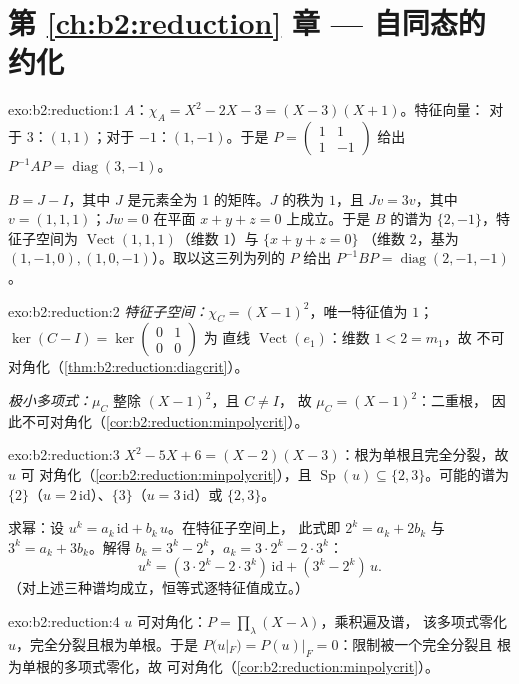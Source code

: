 \section*{第 \ref{ch:b2:reduction} 章 --- 自同态的约化}

\begin{solution}{exo:b2:reduction:1}
$A$：$\chi_A = X^2 - 2X - 3 = (X - 3)(X + 1)$。特征向量：
对于 $3$：$(1,1)$；对于 $-1$：$(1,-1)$。于是 $P = \begin{pmatrix} 1 & 1\\ 1
& -1\end{pmatrix}$ 给出 $P^{-1}AP = \operatorname{diag}(3, -1)$。

$B = J - I$，其中 $J$ 是元素全为 1 的矩阵。$J$ 的秩为 $1$，且
$Jv = 3v$，其中 $v = (1,1,1)$；$Jw = 0$ 在平面 $x + y + z =
0$ 上成立。于是 $B$ 的谱为 $\{2, -1\}$，特征子空间为
$\operatorname{Vect}(1,1,1)$（维数 $1$）与 $\{x + y + z = 0\}$
（维数 $2$，基为 $(1,-1,0), (1,0,-1)$）。取以这三列为列的 $P$
给出 $P^{-1}BP = \operatorname{diag}(2, -1, -1)$。
\end{solution}

\begin{solution}{exo:b2:reduction:2}
\emph{特征子空间：}$\chi_C = (X-1)^2$，唯一特征值为 $1$；
$\ker(C - I) = \ker\begin{pmatrix} 0&1\\ 0&0\end{pmatrix}$ 为
直线 $\operatorname{Vect}(e_1)$：维数 $1 < 2 = m_1$，故
不可对角化（\cref{thm:b2:reduction:diagcrit}）。

\emph{极小多项式：}$\mu_C$ 整除 $(X-1)^2$，且 $C \neq I$，
故 $\mu_C = (X-1)^2$：二重根，
因此不可对角化（\cref{cor:b2:reduction:minpolycrit}）。
\end{solution}

\begin{solution}{exo:b2:reduction:3}
$X^2 - 5X + 6 = (X-2)(X-3)$：根为单根且完全分裂，故 $u$ 可
对角化（\cref{cor:b2:reduction:minpolycrit}），且
$\operatorname{Sp}(u) \subseteq \{2, 3\}$。可能的谱为
$\{2\}$（$u = 2\,\mathrm{id}$）、$\{3\}$（$u = 3\,\mathrm{id}$）或
$\{2, 3\}$。

求幂：设 $u^k = a_k\,\mathrm{id} + b_k\,u$。在特征子空间上，
此式即 $2^k = a_k + 2b_k$ 与 $3^k = a_k + 3b_k$。解得 $b_k
= 3^k - 2^k$，$a_k = 3\cdot2^k - 2\cdot 3^k$：
\[
u^k = (3\cdot 2^k - 2\cdot 3^k)\,\mathrm{id} + (3^k - 2^k)\, u .
\]
（对上述三种谱均成立，恒等式逐特征值成立。）
\end{solution}

\begin{solution}{exo:b2:reduction:4}
$u$ 可对角化：$P = \prod_{\lambda}(X - \lambda)$，乘积遍及谱，
该多项式零化 $u$，完全分裂且根为单根。于是 $P(u|_F) =
P(u)|_F = 0$：限制被一个完全分裂且
根为单根的多项式零化，故
可对角化（\cref{cor:b2:reduction:minpolycrit}）。
\end{solution}

